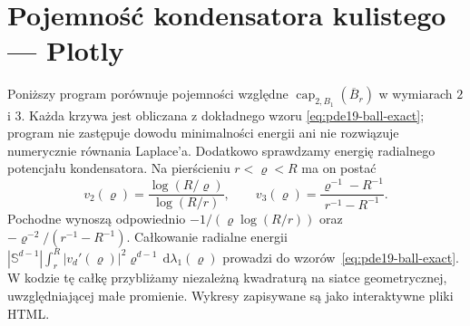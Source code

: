 \section{Pojemność kondensatora kulistego — Plotly}
\label{sec:pde19-code}
Poniższy program porównuje pojemności względne
$\operatorname{cap}_{2,B_1}(\overline B_r)$ w wymiarach $2$ i $3$.
Każda krzywa jest obliczana z dokładnego wzoru
\eqref{eq:pde19-ball-exact}; program nie zastępuje dowodu
minimalności energii ani nie rozwiązuje numerycznie
równania Laplace'a. Dodatkowo sprawdzamy energię
radialnego potencjału kondensatora. Na pierścieniu
$r<\varrho<R$ ma on postać
\[
 v_2(\varrho)=\frac{\log(R/\varrho)}{\log(R/r)},
 \qquad
 v_3(\varrho)=\frac{\varrho^{-1}-R^{-1}}{r^{-1}-R^{-1}}.
\]
Pochodne wynoszą odpowiednio
$-1/(\varrho\log(R/r))$ oraz
$-\varrho^{-2}/(r^{-1}-R^{-1})$.
Całkowanie radialne energii
$|\mathbb S^{d-1}|\int_r^R|v_d'(\varrho)|^2
\varrho^{d-1}\,\mathrm d\lambda_1(\varrho)$
prowadzi do wzorów~\eqref{eq:pde19-ball-exact}.
W kodzie tę całkę przybliżamy niezależną kwadraturą
na siatce geometrycznej, uwzględniającej małe promienie.
Wykresy zapisywane są jako interaktywne pliki HTML.
